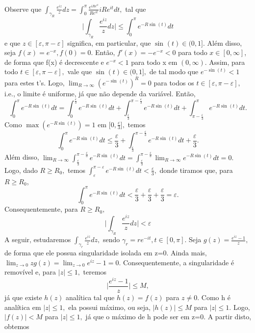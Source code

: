 \documentclass[complex.tex]{subfiles}
\begin{document}
\begin{exer*}
	Observe que \(\int_{\gamma_{R}}^{}\frac{e^{iz}}{z}dz = \int_{0}^{\pi }\frac{e^{iRe^{it}}}{R e^{it}}i R e^{it}dt,\) tal que
	\[
		\biggl\vert \int_{\gamma_{R}}^{}\frac{e^{iz}}{z}dz \biggr\vert \leq \int_{0}^{\pi }e^{-R\sin^{}{(t)}}dt
	\]
	e que \(z\in[\varepsilon , \pi -\varepsilon ]\) significa, em particular, que \(\sin^{}{(t)}\in(0, 1].\) Além disso, seja
	\(f(x) = e^{-x}, f(0) = 0\). Então, \(f'(x) = -e^{-x}<0\) para todo \(x\in [0, \infty]\), de forma que f(x) é decrescente e \(e^{-x}<1\) para
	todo x em \((0, \infty).\) Assim, para todo \(t\in[\varepsilon , \pi -\varepsilon ],\) vale que \(\sin^{}{(t)}\in(0, 1],\) de tal modo
	que \(e^{-\sin^{}{(t)}} < 1\) para estes t's. Logo, \(\lim_{R\to \infty}(e^{-\sin^{}{(t)}})^{R} = 0\) para todos os \(t\in[\varepsilon , \pi -\varepsilon ],\) i.e.,
	o limite é uniforme, já que não depende da variável. Então,
	\[
		\int_{0}^{\pi }e^{-R\sin^{}{(t)}}dt = \int_{0}^{\frac{\varepsilon }{3}}e^{-R\sin^{}{(t)}}dt + \int_{\frac{\varepsilon }{3}}^{\pi - \frac{\varepsilon }{3}}e^{-R\sin^{}{(t)}}dt + \int_{\pi - \frac{\varepsilon }{3}}^{\pi }e^{-R\sin^{}{(t)}}dt.
	\]
	Como \(\max{(e^{-R\sin^{}{(t)}})} = 1\) em \(\biggl[0, \frac{\varepsilon }{3}\biggr],\) temos
	\[
		\int_{0}^{\pi }e^{-R\sin^{}{(t)}}dt \leq \frac{\varepsilon }{3} + \int_{\frac{\varepsilon }{3}}^{\pi - \frac{\varepsilon }{3}}e^{-R\sin^{}{(t)}}dt + \frac{\varepsilon }{3}.
	\]
	Além disso, \(\lim_{R\to \infty}\int_{\frac{\varepsilon }{3}}^{\pi - \frac{\varepsilon }{3}}e^{-R\sin^{}{(t)}}dt = \int_{\frac{\varepsilon }{3}}^{\pi -\frac{\varepsilon }{3}}\lim_{R\to \infty}e^{-R\sin^{}{(t)}}dt = 0.\)
	Logo, dado \(R \geq R_{0},\) temos \(\int_{\varepsilon }^{\pi -\varepsilon }e^{-R\sin^{}{(t)}}dt < \frac{\varepsilon }{3},\) donde tiramos que, para \(R\geq R_{0}\),
	\[
		\int_{0}^{\pi }e^{-R\sin^{}{(t)}}dt < \frac{\varepsilon }{3}+\frac{\varepsilon }{3}+\frac{\varepsilon }{3} = \varepsilon .
	\]
	Consequentemente, para \(R\geq R_{0},\)
	\[
		\biggl\vert \int_{\gamma_{R}}^{}\frac{e^{iz}}{z}dz \biggr\vert < \varepsilon
	\]
	A seguir, estudaremos \(\int_{\gamma_{r}}^{}\frac{e^{iz}}{z}dz,\) sendo \(\gamma_{r} = re^{-it}, t\in[0, \pi ].\)
	Seja \(g(z) = \frac{e^{iz}-1}{z},\) de forma que ele possua singularidade isolada em z=0. Ainda mais, \(\lim_{z\to 0}zg(z)=\lim_{z\to 0}e^{iz}-1 = 0.\)
	Consequentemente, a singularidade é removível e, para \(|z|\leq 1,\) teremos
	\[
		\biggl\vert \frac{e^{iz}-1}{z} \biggr\vert \leq M,
	\]
	já que existe \(h(z)\) analítica tal que \(h(z)=f(z)\) para \(z\neq0\). Como h é analítica em \(|z|\leq 1,\) ela possui máximo, ou seja,
	\(|h(z)|\leq M\) para \(|z|\leq 1.\) Logo, \(|f(z)| < M\) para \(|z|\leq 1,\) já que o máximo de h pode ser em z=0. A partir disto, obtemos

\end{exer*}
\end{document}
